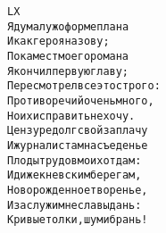 \begin{minipage}[t]{\dimexpr 0.5\textwidth -\tabcolsep-.5pt}
\begin{alltt}\normalfont\centering
LX
Я думал уж о форме плана
И как героя назову;
Покамест моего романа
Я кончил первую главу;
Пересмотрел все это строго:
Противоречий очень много,
Но их исправить не хочу.
Цензуре долг свой заплачу
И журналистам на съеденье
Плоды трудов моих отдам:
Иди же к невским берегам,
Новорожденное творенье,
И заслужи мне славы дань:
Кривые толки, шум и брань!
\end{alltt}
\end{minipage}
